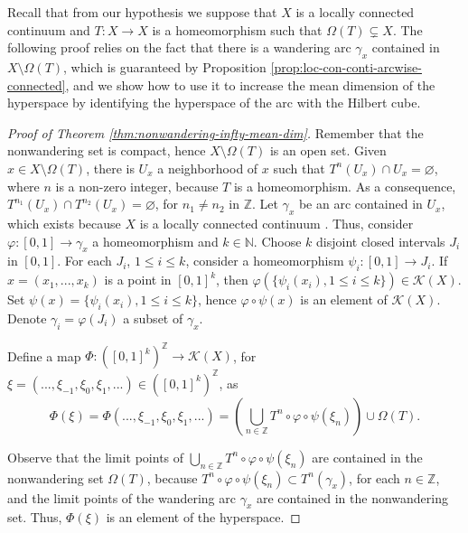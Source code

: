 \documentclass[sn-mathphys-num]{sn-jnl}%
\theoremstyle{thmstyleone}%
\theoremstyle{thmstyletwo}%
\theoremstyle{thmstylethree}%
\newcommand*\hyp[1]{\mathcal{#1}}
\begin{document}
Recall that from our hypothesis we suppose that $X$ is a locally connected continuum and $T: X \to X$ is a homeomorphism such that $\Omega(T) \subsetneq X$. The following proof relies on the fact that there is a wandering arc $\gamma_x$ contained in $X\setminus\Omega(T)$, which is guaranteed by Proposition \ref{prop:loc-con-conti-arcwise-connected}, and we show how to use it to increase the mean dimension of the hyperspace by identifying the hyperspace of the arc with the Hilbert cube.

\begin{proof}[Proof of Theorem \emph{\ref{thm:nonwandering-infty-mean-dim}}]
Remember that the nonwandering set is compact, hence $X\setminus\Omega(T)$ is an open set. Given $x \in X\setminus\Omega(T)$, there is $U_x$ a neighborhood of $x$ such that $T^n(U_x) \cap U_x = \varnothing$, where $n$ is a non-zero integer, because $T$ is a homeomorphism. As a consequence, $T^{n_1}(U_x) \cap T^{n_2}(U_x) = \varnothing$, for $n_1 \neq n_2$ in $\mathbb{Z}$. Let $\gamma_x$ be an arc contained in $U_x$, which exists because $X$ is a locally connected continuum \cite[Theorem 10.2]{illanes_nadler_1999}. Thus, consider $\varphi: [0, 1] \to \gamma_x$ a homeomorphism and $k \in \mathbb{N}$. Choose $k$ disjoint closed intervals $J_i$ in $[0, 1]$. For each $J_i$, $1 \leq i \leq k$, consider a homeomorphism $\psi_i: [0, 1] \to J_i$. If $x = (x_1, ..., x_k)$ is a point in $[0, 1]^k$, then $\varphi(\{\psi_i(x_i), 1 \leq i \leq k\}) \in \hyp{K}(X)$. Set $\psi(x) = \{\psi_i(x_i), 1 \leq i \leq k\}$, hence $\varphi\circ\psi(x)$ is an element of $\hyp{K}(X)$. Denote $\gamma_i = \varphi(J_i)$ a subset of $\gamma_x$.

    Define a map $\Phi: ([0, 1]^k)^\mathbb{Z} \to \hyp{K}(X)$, for $\xi = (..., \xi_{-1}, \xi_0, \xi_1, ...) \in ([0, 1]^k)^\mathbb{Z}$, as
    \begin{equation*}
        \Phi(\xi) = \Phi(..., \xi_{-1}, \xi_0, \xi_1, ...) = \left(\bigcup\limits_{n \in \mathbb{Z}} T^n\circ\varphi\circ\psi(\xi_n)\right) \cup \Omega(T).
    \end{equation*}

    Observe that the limit points of $\bigcup\limits_{n \in \mathbb{Z}} T^n\circ\varphi\circ\psi(\xi_n)$ are contained in the nonwandering set $\Omega(T)$, because $T^n\circ\varphi\circ\psi(\xi_n) \subset T^n(\gamma_x)$, for each $n \in \mathbb{Z}$, and the limit points of the wandering arc $\gamma_x$ are contained in the nonwandering set. Thus, $\Phi(\xi)$ is an element of the hyperspace.


\end{proof}
\end{document}
